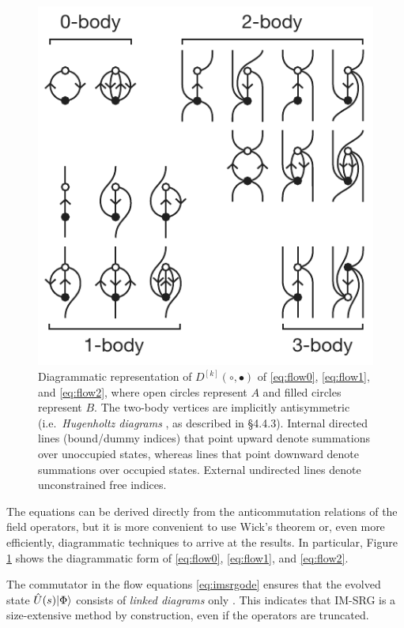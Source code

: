 \begin{figure}
\includegraphics{fig-diagrams-imsrg}
\caption{Diagrammatic representation of $D^{[k]}(\circ, \bullet)$ of \eqref{eq:flow0}, \eqref{eq:flow1}, and \eqref{eq:flow2}, where open circles represent $A$ and filled circles represent $B$.  The two-body vertices are implicitly antisymmetric (i.e.\ \textit{Hugenholtz diagrams} \cite{HUGENHOLTZ1957481}, as described in \cite{shavitt2009many} \S 4.4.3).  Internal directed lines (bound/dummy indices) that point upward denote summations over unoccupied states, whereas lines that point downward denote summations over occupied states.  External undirected lines denote unconstrained free indices.}
\label{fig:diagrams-imsrg}
\end{figure}

The equations can be derived directly from the anticommutation relations of the field operators, but it is more convenient to use Wick's theorem \cite{PhysRev.80.268} or, even more efficiently, diagrammatic techniques \cite{shavitt2009many} to arrive at the results.  In particular, Figure \ref{fig:diagrams-imsrg} shows the diagrammatic form of \eqref{eq:flow0}, \eqref{eq:flow1}, and \eqref{eq:flow2}.

The commutator in the flow equations \eqref{eq:imsrgode} ensures that the evolved state $\hat U(s) | \Phi \rangle$ consists of \emph{linked diagrams} only \cite{shavitt2009many}.  This indicates that IM-SRG is a size-extensive \cite{ISI:A1981MN73700014} method by construction, even if the operators are truncated.

